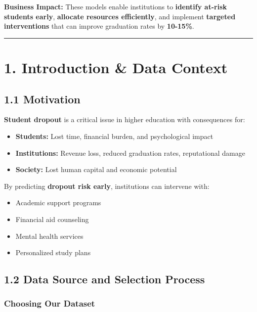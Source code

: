 \documentclass[
]{article}
\providecommand{\tightlist}{%
  \setlength{\itemsep}{0pt}\setlength{\parskip}{0pt}}
\begin{document}
\textbf{Business Impact:} These models enable institutions to
\textbf{identify at-risk students early}, \textbf{allocate resources
efficiently}, and implement \textbf{targeted interventions} that can
improve graduation rates by \textbf{10-15\%}.

\begin{center}\rule{0.5\linewidth}{0.5pt}\end{center}

\section{1. Introduction \& Data
Context}\label{introduction-data-context}

\subsection{1.1 Motivation}\label{motivation}

\textbf{Student dropout} is a critical issue in higher education with
consequences for:

\begin{itemize}
\tightlist
\item
  \textbf{Students:} Lost time, financial burden, and psychological
  impact
\item
  \textbf{Institutions:} Revenue loss, reduced graduation rates,
  reputational damage
\item
  \textbf{Society:} Lost human capital and economic potential
\end{itemize}

By predicting \textbf{dropout risk early}, institutions can intervene
with:

\begin{itemize}
\tightlist
\item
  Academic support programs
\item
  Financial aid counseling
\item
  Mental health services
\item
  Personalized study plans
\end{itemize}

\subsection{1.2 Data Source and Selection
Process}\label{data-source-and-selection-process}

\subsubsection{Choosing Our Dataset}\label{choosing-our-dataset}
\end{document}
